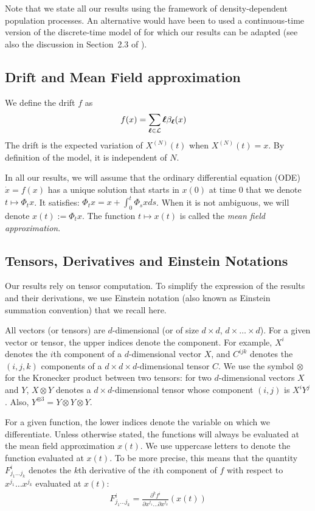 \documentclass[sigconf]{acmart}
\newcommand\XN{X^{(N)}}
\newcommand\bl{{\text{\boldmath$\ell$}}}
\newcommand\calL{\mathcal{L}}
\begin{document}
Note that we state all our results using the framework of
density-dependent population processes. An alternative would have been
to used a continuous-time version of the discrete-time model of
\cite{benaim2008class} for which our results can be adapted (see also
the discussion in Section~2.3 of \cite{gast2017refined}).


\subsection{Drift and Mean Field approximation}

We define the drift $f$ as
\begin{align*}
  f(x) &= \sum_{\bl\in\calL}\bl\beta_\bl(x) 
\end{align*}
The drift is the expected variation of $\XN(t)$ when $\XN(t)=x$.  By
definition of the model, it is independent of $N$.

In all our results, we will assume that the ordinary differential
equation (ODE) $\dot{x}=f(x)$ has a unique solution that starts in
$x(0)$ at time $0$ that we denote $t\mapsto\Phi_tx$. It satisfies:
$\Phi_tx = x + \int_0^t \Phi_s x ds$.
When it is not ambiguous, we will denote $x(t):=\Phi_tx$. The function
$t\mapsto x(t)$ is called the \emph{mean field approximation}.

\subsection{Tensors, Derivatives and Einstein Notations}

Our results rely on tensor computation. To simplify the expression of
the results and their derivations, we use Einstein notation (also
known as Einstein summation convention) that we recall here.

All vectors (or tensors) are $d$-dimensional (or of size $d\times d$,
$d\times \dots\times d$).  For a given vector or tensor, the upper
indices denote the component. For example, $X^i$ denotes the $i$th
component of a $d$-dimensional vector $X$, and $C^{ijk}$ denotes the
$(i,j,k)$ components of a $d\times d \times d$-dimensional tensor
$C$.  We use the symbol $\otimes$ for the Kronecker product between
two tensors: for two $d$-dimensional vectors $X$ and $Y$,
$X\otimes Y$ denotes a $d\times d$-dimensional tensor whose component
$(i,j)$ is $X^iY^j$. Also, $Y^{\otimes 3}=Y\otimes Y\otimes Y$.

For a given function, the lower indices denote the variable on which
we differentiate. Unless otherwise stated, the functions will always
be evaluated at the mean field approximation $x(t)$.  We use uppercase
letters to denote the function evaluated at $x(t)$.
To be more precise, this means that the quantity
$F^{i}_{j_1\dots j_k}$ denotes the $k$th derivative of the $i$th
component of $f$ with respect to $x^{j_1}\dots x^{j_k}$ evaluated at
$x(t)$:
\begin{align*}
  F^i_{j_1\dots j_k} = \frac{\partial^k{f^i}}{\partial x^{j_1}\dots
  \partial x^{j_k}}(x(t))
\end{align*}
\end{document}
